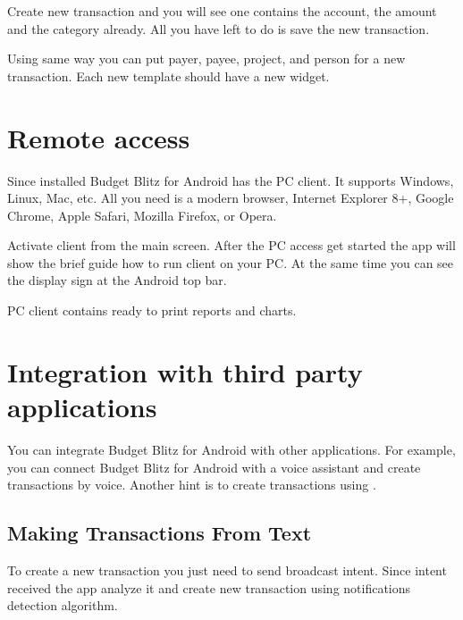 \documentclass[a4paper,10pt,english]{sphinxmanual}
\begin{document}
\noindent{}

Create new transaction and you will see one contains the account, the amount and the category already.
All you have left to do is save the new transaction.

Using same way you can put payer, payee, project, and person for a new transaction. Each new
template should have a new widget.


\chapter{Remote access}
\label{\detokenize{remote-access:remote-access}}\label{\detokenize{remote-access:chapter-remote-access}}\label{\detokenize{remote-access::doc}}
Since installed Budget Blitz for Android has the PC client. It supports Windows, Linux, Mac, etc. All you need is
a modern browser, Internet Explorer 8+, Google Chrome, Apple Safari, Mozilla Firefox, or Opera.

\noindent{}
\noindent{}
\noindent{}

Activate client from the main screen. After the PC access get started the app will show
the brief guide how to run client on your PC. At the same time you can see the display sign
at the Android top bar.

PC client contains ready to print reports and charts.


\chapter{Integration with third party applications}
\label{\detokenize{api:integration-with-third-party-applications}}\label{\detokenize{api:chapter-api}}\label{\detokenize{api::doc}}
You can integrate Budget Blitz for Android with other applications. For example, you can connect Budget Blitz for Android
with a voice assistant and create transactions by voice. Another hint is to create
transactions using .


\section{Making Transactions From Text}
\label{\detokenize{api:making-transactions-from-text}}
To create a new transaction you just need to send broadcast intent. Since intent received the app analyze it
and create new transaction using notifications detection algorithm.
\end{document}
